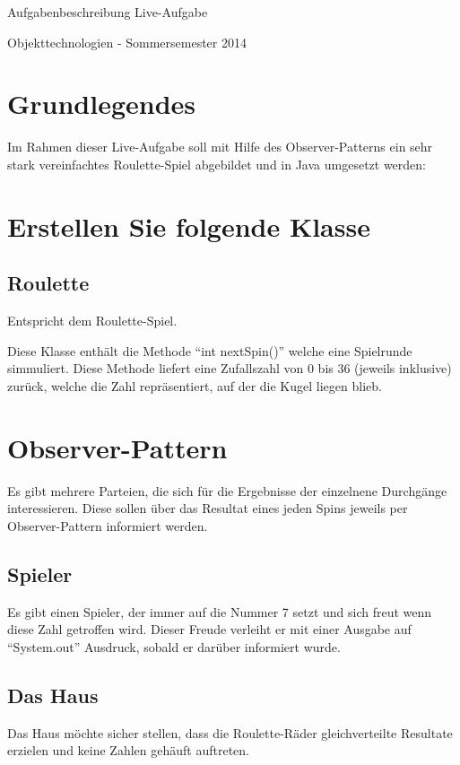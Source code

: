 \documentclass[oneside,a4paper]{scrartcl}
\author{Johannes Schneider}
\begin{document}
\centerline{\sc \large Aufgabenbeschreibung Live-Aufgabe}
\vspace{.5pc}
\centerline{\sc Objekttechnologien - Sommersemester 2014}
\vspace{2pc}



\section{Grundlegendes}

Im Rahmen dieser Live-Aufgabe soll mit Hilfe des Observer-Patterns ein 
sehr stark vereinfachtes Roulette-Spiel abgebildet und in Java umgesetzt werden:


\section{Erstellen Sie folgende Klasse}


\subsection{Roulette}
Entspricht dem Roulette-Spiel. 

Diese Klasse enthält die Methode \enquote{int nextSpin()} welche eine Spielrunde
simmuliert. Diese Methode liefert eine Zufallszahl von 0 bis 36 (jeweils inklusive)
zurück, welche die Zahl repräsentiert, auf der die Kugel liegen blieb.


\section{Observer-Pattern}
Es gibt mehrere Parteien, die sich für die Ergebnisse der einzelnene Durchgänge interessieren. 
Diese sollen über das Resultat eines jeden Spins jeweils per Observer-Pattern informiert werden.

\subsection{Spieler}
Es gibt einen Spieler, der immer auf die Nummer 7 setzt und sich freut
wenn diese Zahl getroffen wird. 
Dieser Freude verleiht er mit einer Ausgabe auf \enquote{System.out} Ausdruck,
sobald er darüber informiert wurde.

\subsection{Das Haus}
Das Haus möchte sicher stellen, dass die Roulette-Räder gleichverteilte Resultate erzielen und keine
Zahlen gehäuft auftreten.
\end{document}
